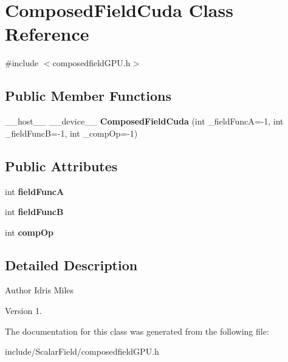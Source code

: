 \hypertarget{classComposedFieldCuda}{}\section{Composed\+Field\+Cuda Class Reference}
\label{classComposedFieldCuda}


{\ttfamily \#include $<$composedfield\+G\+P\+U.\+h$>$}

\subsection*{Public Member Functions}
\begin{DoxyCompactItemize}
\item 
\+\_\+\+\_\+host\+\_\+\+\_\+ \+\_\+\+\_\+device\+\_\+\+\_\+ {\bfseries Composed\+Field\+Cuda} (int \+\_\+field\+FuncA=-\/1, int \+\_\+field\+FuncB=-\/1, int \+\_\+comp\+Op=-\/1)\hypertarget{classComposedFieldCuda_aeb1477c754308d2a599e0cc0feead61c}{}\label{classComposedFieldCuda_aeb1477c754308d2a599e0cc0feead61c}

\end{DoxyCompactItemize}
\subsection*{Public Attributes}
\begin{DoxyCompactItemize}
\item 
int {\bfseries field\+FuncA}\hypertarget{classComposedFieldCuda_a9c679239d9de7e41a6c31c7b73c50532}{}\label{classComposedFieldCuda_a9c679239d9de7e41a6c31c7b73c50532}

\item 
int {\bfseries field\+FuncB}\hypertarget{classComposedFieldCuda_aa41c397a6de908083e890c5acce49755}{}\label{classComposedFieldCuda_aa41c397a6de908083e890c5acce49755}

\item 
int {\bfseries comp\+Op}\hypertarget{classComposedFieldCuda_a62a02e83f861ae88ca296af687ef19ec}{}\label{classComposedFieldCuda_a62a02e83f861ae88ca296af687ef19ec}

\end{DoxyCompactItemize}


\subsection{Detailed Description}
\begin{DoxyAuthor}{Author}
Idris Miles 
\end{DoxyAuthor}
\begin{DoxyVersion}{Version}
1. 
\end{DoxyVersion}


The documentation for this class was generated from the following file\+:\begin{DoxyCompactItemize}
\item 
include/\+Scalar\+Field/composedfield\+G\+P\+U.\+h\end{DoxyCompactItemize}
